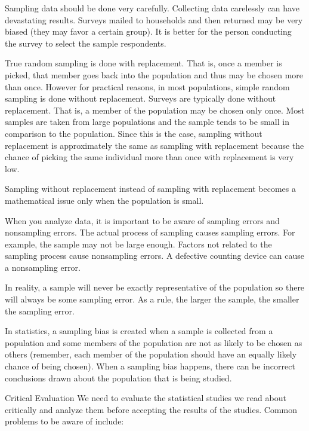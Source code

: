 \documentclass[
  letterpaper,
  DIV=11,
  numbers=noendperiod]{scrreprt}
\begin{document}
Sampling data should be done very carefully. Collecting data carelessly
can have devastating results. Surveys mailed to households and then
returned may be very biased (they may favor a certain group). It is
better for the person conducting the survey to select the sample
respondents.

True random sampling is done with replacement. That is, once a member is
picked, that member goes back into the population and thus may be chosen
more than once. However for practical reasons, in most populations,
simple random sampling is done without replacement. Surveys are
typically done without replacement. That is, a member of the population
may be chosen only once. Most samples are taken from large populations
and the sample tends to be small in comparison to the population. Since
this is the case, sampling without replacement is approximately the same
as sampling with replacement because the chance of picking the same
individual more than once with replacement is very low.

Sampling without replacement instead of sampling with replacement
becomes a mathematical issue only when the population is small.

When you analyze data, it is important to be aware of sampling errors
and nonsampling errors. The actual process of sampling causes sampling
errors. For example, the sample may not be large enough. Factors not
related to the sampling process cause nonsampling errors. A defective
counting device can cause a nonsampling error.

In reality, a sample will never be exactly representative of the
population so there will always be some sampling error. As a rule, the
larger the sample, the smaller the sampling error.

In statistics, a sampling bias is created when a sample is collected
from a population and some members of the population are not as likely
to be chosen as others (remember, each member of the population should
have an equally likely chance of being chosen). When a sampling bias
happens, there can be incorrect conclusions drawn about the population
that is being studied.

Critical Evaluation We need to evaluate the statistical studies we read
about critically and analyze them before accepting the results of the
studies. Common problems to be aware of include:
\end{document}
